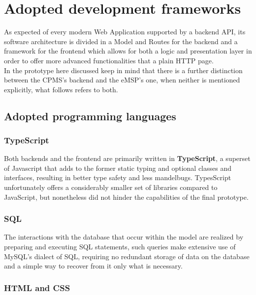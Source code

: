 \documentclass[11pt]{article}
\begin{document}
\newpage

\section{Adopted development frameworks}

As expected of every modern Web Application supported by a backend API, its software architecture is divided in a Model and Routes for the backend and a framework for the frontend which allows for both a logic and presentation layer in order to offer more advanced functionalities that a plain HTTP page. \\
In the prototype here discussed keep in mind that there is a further distinction between the CPMS's backend and the eMSP's one, when neither is mentioned explicitly, what follows refers to both.

\subsection{Adopted programming languages}

\subsubsection{TypeScript}

Both backends and the frontend are primarily written in \textbf{TypeScript}, a superset of Javascript that adds to the former static typing and optional classes and interfaces, resulting in better type safety and less mandelbugs. TypesScript unfortunately offers a considerably smaller set of libraries compared to JavaScript, but nonetheless did not hinder the capabilities of the final prototype.

\subsubsection{SQL}

The interactions with the database that occur within the model are realized by preparing and executing SQL statements, such queries make extensive use of MySQL's dialect of SQL, requiring no redundant storage of data on the database and a simple way to recover from it only what is necessary.

\subsubsection{HTML and CSS}

\end{document}
